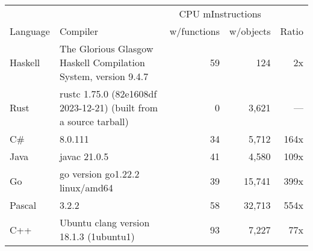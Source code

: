 \documentclass{article}
\begin{document}
      \begin{tabularx}{\linewidth}{lXrrr}
      \toprule
        & & \multicolumn{2}{c}{CPU mInstructions} & \\
        Language & Compiler & w/functions & w/objects & Ratio \\
      \midrule
    Haskell & The Glorious Glasgow Haskell Compilation System, version 9.4.7 & 59 & 124 & 2x \\
Rust & rustc 1.75.0 (82e1608df 2023-12-21) (built from a source tarball) & 0 & 3,621 & --- \\
C\# & 8.0.111 & 34 & 5,712 & 164x \\
Java & javac 21.0.5 & 41 & 4,580 & 109x \\
Go & go version go1.22.2 linux/amd64 & 39 & 15,741 & 399x \\
Pascal & 3.2.2 & 58 & 32,713 & 554x \\
C++ & Ubuntu clang version 18.1.3 (1ubuntu1) & 93 & 7,227 & 77x \\

      \bottomrule
      \end{tabularx}
      
\end{document}

